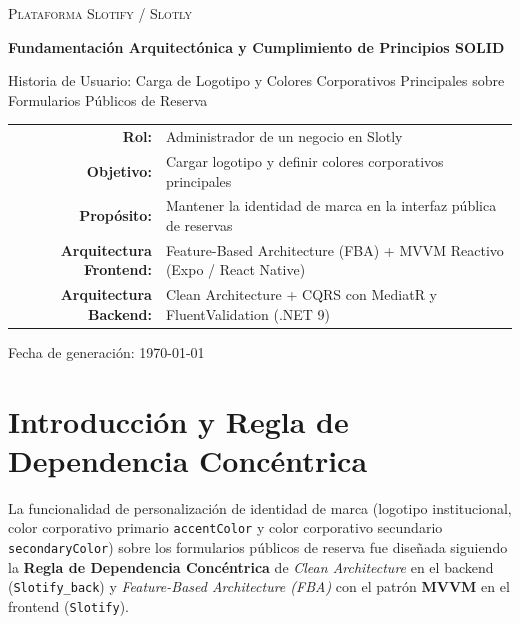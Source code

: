 \documentclass[11pt,a4paper]{article}
\begin{document}
\begin{titlepage}
    \centering
    \vspace*{2cm}
    {\scshape\LARGE Plataforma Slotify / Slotly \par}
    \vspace{0.8cm}
    {\huge\bfseries Fundamentación Arquitectónica y Cumplimiento de Principios SOLID\par}
    \vspace{0.6cm}
    {\Large Historia de Usuario: Carga de Logotipo y Colores Corporativos Principales sobre Formularios Públicos de Reserva\par}
    \vspace{1.5cm}

    \begin{tabular}{rl}
        \toprule
        \textbf{Rol:} & Administrador de un negocio en Slotly \\
        \textbf{Objetivo:} & Cargar logotipo y definir colores corporativos principales \\
        \textbf{Propósito:} & Mantener la identidad de marca en la interfaz pública de reservas \\
        \textbf{Arquitectura Frontend:} & Feature-Based Architecture (FBA) + MVVM Reactivo (Expo / React Native) \\
        \textbf{Arquitectura Backend:} & Clean Architecture + CQRS con MediatR y FluentValidation (.NET 9) \\
        \bottomrule
    \end{tabular}

    \vfill
    {\large Fecha de generación: \today\par}
\end{titlepage}

\tableofcontents
\newpage

\section{Introducción y Regla de Dependencia Concéntrica}

La funcionalidad de personalización de identidad de marca (logotipo institucional, color corporativo primario \texttt{accentColor} y color corporativo secundario \texttt{secondaryColor}) sobre los formularios públicos de reserva fue diseñada siguiendo la \textbf{Regla de Dependencia Concéntrica} de \textit{Clean Architecture} en el backend (\texttt{Slotify\_back}) y \textit{Feature-Based Architecture (FBA)} con el patrón \textbf{MVVM} en el frontend (\texttt{Slotify}).
\end{document}
